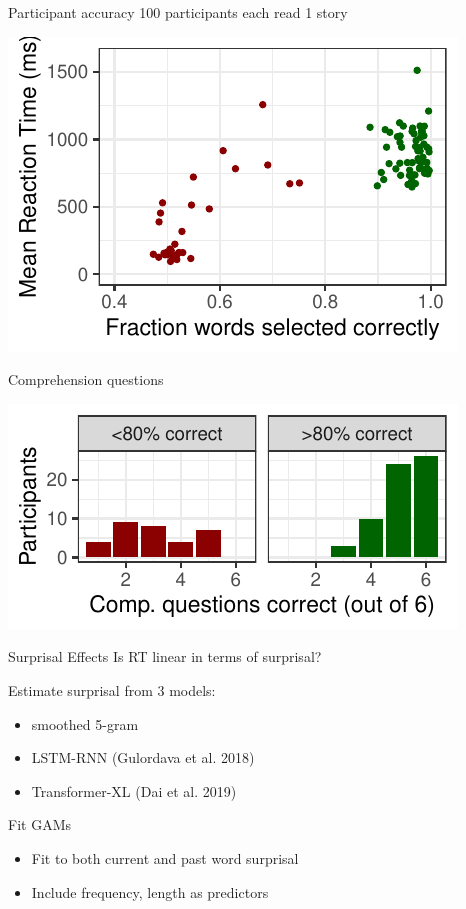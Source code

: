 \documentclass[12pt, xcolor=beamer,table,usenames,dvipsnames, ignorenonframetext, ngerman]{beamer}
\begin{document}
\begin{frame}{Participant accuracy}
100 participants each read 1 story \pause
\begin{center}
\includegraphics[width=.8\textwidth]{../Images/error.pdf}
\end{center}
\end{frame}
\begin{frame}{Comprehension questions}
\begin{center} \pause
\includegraphics[width=.8\textwidth]{../Images/comp.pdf}
\end{center}
\end{frame}



\begin{frame}{Surprisal Effects}
	\large{Is RT linear in terms of surprisal?}\pause
	\medskip
	
	Estimate surprisal from 3 models:
	\begin{itemize}
		\item smoothed 5-gram
		\item LSTM-RNN (Gulordava et al. 2018)
		\item Transformer-XL (Dai et al. 2019)
	\end{itemize}
	
	\pause
	
	Fit GAMs
	\begin{itemize}
		\item Fit to both current and past word surprisal
		\item Include frequency, length as predictors
	\end{itemize}
	
\end{frame}
\end{document}
